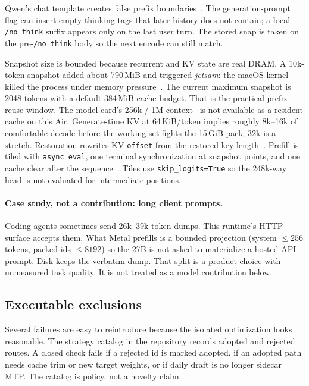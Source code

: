\documentclass[11pt]{article}
\theoremstyle{definition}
\begin{document}
Qwen’s chat template creates false prefix boundaries~\citep{qwen31826}. The generation-prompt flag can insert empty thinking tags that later history does not contain; a local \texttt{/no\_think} suffix appears only on the last user turn. The stored snap is taken on the pre-\texttt{/no\_think} body so the next encode can still match.

Snapshot size is bounded because recurrent and KV state are real DRAM. A 10k-token snapshot added about 790\,MiB and triggered \emph{jetsam}: the macOS kernel killed the process under memory pressure~\citep{applejetsam}. The current maximum snapshot is 2048 tokens with a default 384\,MiB cache budget. That is the practical prefix-reuse window. The model card’s 256k / 1M context~\citep{yarn2024} is not available as a resident cache on this Air. Generate-time KV at 64\,KiB/token implies roughly 8k--16k of comfortable decode before the working set fights the 15\,GiB pack; 32k is a stretch. Restoration rewrites KV \texttt{offset} from the restored key length~\citep{mlxlm1162}. Prefill is tiled with \texttt{async\_eval}, one terminal synchronization at snapshot points, and one cache clear after the sequence~\citep{mlxvlm945}. Tiles use \texttt{skip\_logits=True} so the 248k-way head is not evaluated for intermediate positions.

\paragraph{Case study, not a contribution: long client prompts.}
Coding agents sometimes send 26k--39k-token dumps. This runtime’s HTTP surface accepts them. What Metal prefills is a bounded projection (system $\le 256$ tokens, packed ids $\le 8192$) so the 27B is not asked to materialize a hosted-API prompt. Disk keeps the verbatim dump. That split is a product choice with unmeasured task quality. It is not treated as a model contribution below.

\subsection{Executable exclusions}

Several failures are easy to reintroduce because the isolated optimization looks reasonable. The strategy catalog in the repository records adopted and rejected routes. A closed check fails if a rejected id is marked adopted, if an adopted path needs cache trim or new target weights, or if daily draft is no longer sidecar MTP. The catalog is policy, not a novelty claim.
\end{document}
